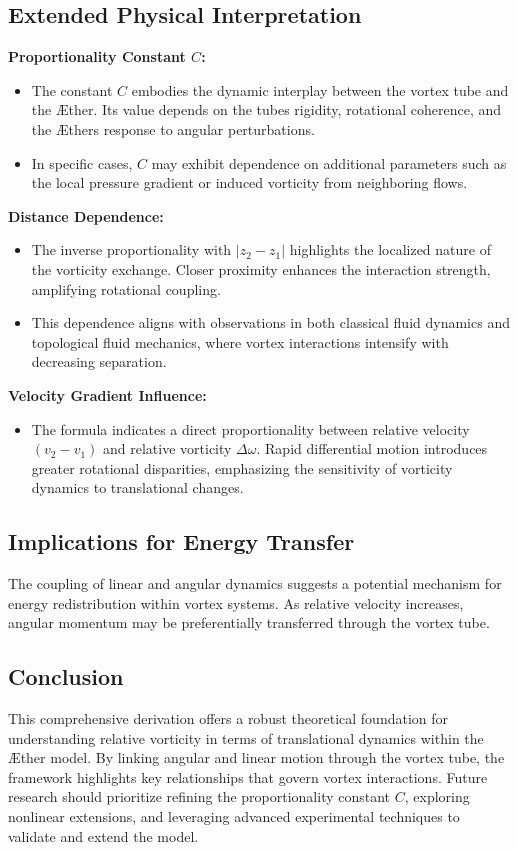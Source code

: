     \subsection*{Extended Physical Interpretation}
    \textbf{Proportionality Constant $C$:}
    \begin{itemize}
        \item The constant $C$ embodies the dynamic interplay between the vortex tube and the Æther. Its value depends on the tube\rqs s rigidity, rotational coherence, and the Æther\rqs s response to angular perturbations.
        \item In specific cases, $C$ may exhibit dependence on additional parameters such as the local pressure gradient or induced vorticity from neighboring flows.
    \end{itemize}

    \textbf{Distance Dependence:}
    \begin{itemize}
        \item The inverse proportionality with $|z_2 - z_1|$ highlights the localized nature of the vorticity exchange. Closer proximity enhances the interaction strength, amplifying rotational coupling.
        \item This dependence aligns with observations in both classical fluid dynamics and topological fluid mechanics, where vortex interactions intensify with decreasing separation.
    \end{itemize}

    \textbf{Velocity Gradient Influence:}
    \begin{itemize}
        \item The formula indicates a direct proportionality between relative velocity $(v_2 - v_1)$ and relative vorticity $\Delta \omega$. Rapid differential motion introduces greater rotational disparities, emphasizing the sensitivity of vorticity dynamics to translational changes.
    \end{itemize}

    \subsection*{Implications for Energy Transfer}
    The coupling of linear and angular dynamics suggests a potential mechanism for energy redistribution within vortex systems. As relative velocity increases, angular momentum may be preferentially transferred through the vortex tube.

    \subsection*{Conclusion}
    This comprehensive derivation offers a robust theoretical foundation for understanding relative vorticity in terms of translational dynamics within the Æther model. By linking angular and linear motion through the vortex tube, the framework highlights key relationships that govern vortex interactions. Future research should prioritize refining the proportionality constant $C$, exploring nonlinear extensions, and leveraging advanced experimental techniques to validate and extend the model.

